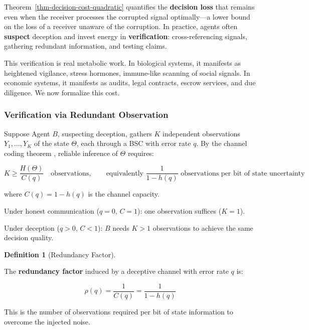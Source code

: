 \documentclass[11pt]{article}
\theoremstyle{plain}
\theoremstyle{definition}
\newtheorem{definition}{Definition}
\theoremstyle{remark}
\let\origsubsubsection\subsubsection
\renewcommand{\subsubsection}{\needspace{4\baselineskip}\origsubsubsection}
\begin{document}
Theorem~\ref{thm-decision-cost-quadratic} quantifies the
\textbf{decision loss} that remains even when the receiver processes the
corrupted signal optimally---a lower bound on the loss of a receiver
unaware of the corruption. In practice, agents often \textbf{suspect}
deception and invest energy in \textbf{verification}: cross-referencing
signals, gathering redundant information, and testing claims.

This verification is real metabolic work. In biological systems, it
manifests as heightened vigilance, stress hormones, immune-like scanning
of social signals. In economic systems, it manifests as audits, legal
contracts, escrow services, and due diligence. We now formalize this
cost.

\subsubsection{Verification via Redundant
Observation}\label{verification-via-redundant-observation}

Suppose Agent \(B\), suspecting deception, gathers \(K\) independent
observations \(Y_1, \ldots, Y_K\) of the state \(\Theta\), each through
a BSC with error rate \(q\). By the channel coding theorem
\citep{Shannon1948}, reliable inference of \(\Theta\) requires:

\[K \geq \frac{H(\Theta)}{C(q)} \quad \text{observations}, \qquad \text{equivalently } \frac{1}{1 - h(q)} \text{ observations per bit of state uncertainty}\]

where \(C(q) = 1 - h(q)\) is the channel capacity.

Under honest communication (\(q = 0\), \(C = 1\)): one observation
suffices (\(K = 1\)).

Under deception (\(q > 0\), \(C < 1\)): \(B\) needs \(K > 1\)
observations to achieve the same decision quality.

\begin{definition}[Redundancy Factor]
\label{def-redundancy-factor}

The \textbf{redundancy factor} induced by a deceptive channel with error rate $q$ is:

$$\rho(q) = \frac{1}{C(q)} = \frac{1}{1 - h(q)}$$

This is the number of observations required per bit of state information to overcome the injected noise.
\end{definition}
\end{document}
